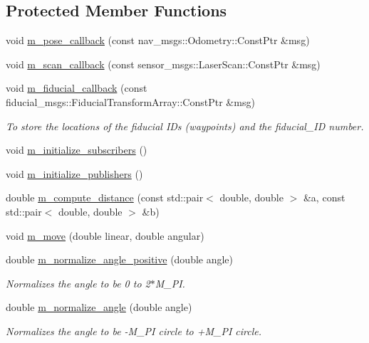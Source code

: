 \subsection*{Protected Member Functions}
\begin{DoxyCompactItemize}
\item 
void \hyperlink{class_bot___controller_acc77fd887b8ddc97431a33f3cf72e82c}{m\+\_\+pose\+\_\+callback} (const nav\+\_\+msgs\+::\+Odometry\+::\+Const\+Ptr \&msg)
\item 
void \hyperlink{class_bot___controller_ae7a0c2b3a9a5adc3464dc581003c3ce1}{m\+\_\+scan\+\_\+callback} (const sensor\+\_\+msgs\+::\+Laser\+Scan\+::\+Const\+Ptr \&msg)
\item 
void \hyperlink{class_bot___controller_affa0d8469972f97d731d72c8654a9f90}{m\+\_\+fiducial\+\_\+callback} (const fiducial\+\_\+msgs\+::\+Fiducial\+Transform\+Array\+::\+Const\+Ptr \&msg)
\begin{DoxyCompactList}\small\item\em To store the locations of the fiducial I\+Ds (waypoints) and the fiducial\+\_\+\+ID number. \end{DoxyCompactList}\item 
void \hyperlink{class_bot___controller_a90bb076f647b36f2cf5b5e57ae98ce41}{m\+\_\+initialize\+\_\+subscribers} ()
\item 
void \hyperlink{class_bot___controller_ab8d1e3dd6aced881ebcc76e32aaf0910}{m\+\_\+initialize\+\_\+publishers} ()
\item 
double \hyperlink{class_bot___controller_ac099bee38ac176cc8de6a6f78581eaa1}{m\+\_\+compute\+\_\+distance} (const std\+::pair$<$ double, double $>$ \&a, const std\+::pair$<$ double, double $>$ \&b)
\item 
void \hyperlink{class_bot___controller_a2e53992a4bdea36f745569bfe0035916}{m\+\_\+move} (double linear, double angular)
\item 
double \hyperlink{class_bot___controller_a622aa7b81b1bed82ab5478c7bd9ddd07}{m\+\_\+normalize\+\_\+angle\+\_\+positive} (double angle)
\begin{DoxyCompactList}\small\item\em Normalizes the angle to be 0 to 2$\ast$\+M\+\_\+\+PI. \end{DoxyCompactList}\item 
double \hyperlink{class_bot___controller_a234205057d0671c04b143ec5f794741c}{m\+\_\+normalize\+\_\+angle} (double angle)
\begin{DoxyCompactList}\small\item\em Normalizes the angle to be -\/\+M\+\_\+\+PI circle to +\+M\+\_\+\+PI circle. \end{DoxyCompactList}\end{DoxyCompactItemize}
